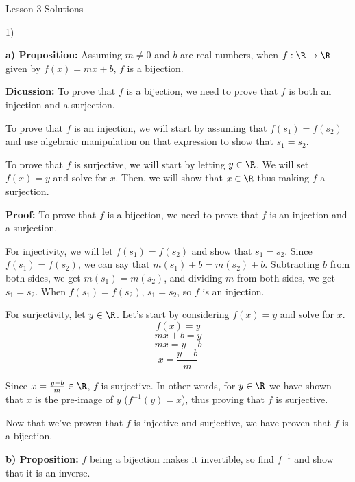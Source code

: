 



    \begin{center}
        \huge \sc Lesson 3 Solutions
    \end{center}

    \begin{paragraph}{1)}
    
    \textbf{a) Proposition:} Assuming $m \neq 0$ and $b$ are real numbers, when $f: \R \rightarrow \R$ given by $f(x) = mx + b$, $f$ is a bijection.  
    \spacing

    \textbf{Dicussion:} To prove that $f$ is a bijection, we need
    to prove that $f$ is both an injection and a surjection. 
    \spacing

    To prove that $f$ is an injection, we will start by assuming that 
    $f(s_1) = f(s_2)$ and use algebraic manipulation on that expression 
    to show that $s_1 = s_2$. 
    \spacing

    To prove that $f$ is surjective, we will start by letting $y \in \R$.
    We will set $f(x) = y$ and solve for $x$. Then, we will show that $x \in \R$
    thus making $f$ a surjection. 
    \spacing

    \textbf{Proof:} To prove that $f$ is a bijection, we need to prove that $f$ is an injection and a surjection.
    \spacing

    For injectivity, we will let $f(s_1) = f(s_2)$ and show that $s_1 = s_2$.
    Since $f(s_1) = f(s_2)$, we can say that $m(s_1) + b = m(s_2) + b$.
    Subtracting $b$ from both sides, we get $m(s_1) = m(s_2)$, and dividing $m$ from both sides,
    we get $s_1 = s_2$. When $f(s_1) = f(s_2)$, $s_1 = s_2$, so $f$ is an injection.
    \spacing 

    For surjectivity, let $y \in \R$. Let's start by considering $f(x) = y$ and solve for $x$.
    $$f(x) = y$$
    $$mx + b = y$$
    $$mx = y - b$$
    $$x = \frac{y-b}{m}$$
    
    Since $x = \frac{y - b}{m} \in \R$, $f$ is surjective. 
    In other words, for $y \in \R$ we have shown that $x$ is the pre-image of $y$ ($f^{-1}(y) = x$),
    thus proving that $f$ is surjective.
    \spacing

    Now that we've proven that $f$ is injective and surjective,
    we have proven that $f$ is a bijection.
    \bigskip

    \textbf{b) Proposition:} $f$ being a bijection makes it invertible, so find $f^{-1}$ and show that it is an inverse.
    \spacing


\end{paragraph}
